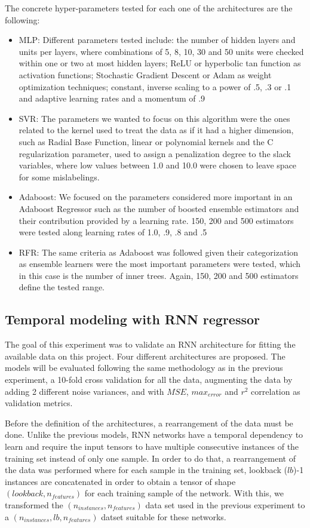 \documentclass[anon]{CI}
\begin{document}
The concrete hyper-parameters tested for each one of the architectures are the following:

\begin{itemize}
    \item MLP: Different parameters tested include: the number of hidden layers and units per layers, where combinations of 5, 8, 10, 30 and 50 units were checked within one or two at most hidden layers; ReLU or hyperbolic tan function as activation functions; Stochastic Gradient Descent or Adam as weight optimization techniques; constant, inverse scaling to a power of .5, .3 or .1 and adaptive learning rates and a momentum of .9
    \item SVR: The parameters we wanted to focus on this algorithm were the ones related to the kernel used to treat the data as if it had a higher dimension, such as Radial Base Function, linear or polynomial kernels and the C regularization parameter, used to assign a penalization degree to the slack variables, where low values between 1.0 and 10.0 were chosen to leave space for some mislabelings.
    \item Adaboost: We focused on the parameters considered more important in an Adaboost Regressor such as the number of boosted ensemble estimators and their contribution provided by a learning rate. 150, 200 and 500 estimators were tested along learning rates of 1.0, .9, .8 and .5
    \item RFR: The same criteria as Adaboost was followed given their categorization as ensemble learners were the most important parameters were tested, which in this case is the number of inner trees. Again, 150, 200 and 500 estimators define the tested range.
\end{itemize}

\subsection{Temporal modeling with RNN regressor}

The goal of this experiment was to validate an RNN architecture for fitting the available data on this project. Four different architectures are proposed. The models will be evaluated following the same methodology as in the previous experiment, a 10-fold cross validation for all the data, augmenting the data by adding 2 different noise variances, and with $MSE$, $max_{error}$ and $r^2$ correlation as validation metrics.

Before the definition of the architectures, a rearrangement of the data must be done. Unlike the previous models, RNN networks have a temporal dependency to learn and require the input tensors to have multiple consecutive instances of the training set instead of only one sample. In order to do that, a rearrangement of the data was performed where for each sample in the training set, lookback ($lb$)-1 instances are concatenated in order to obtain a tensor of shape $(lookback, n_{features})$ for each training sample of the network. With this, we transformed the $(n_{instances}, n_{features})$ data set used in the previous experiment to a $(n_{instances}, lb, n_{features})$ datset suitable for these networks. 
\end{document}
